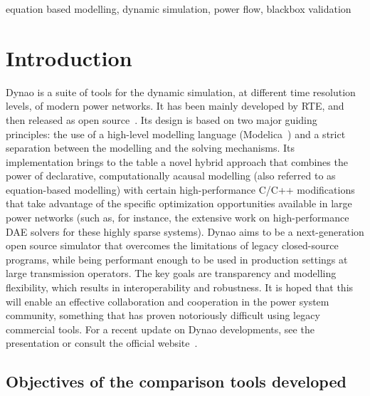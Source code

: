 \documentclass[conference]{IEEEtran}
\newcommand{\Dynawo}{Dyna\textomega o\xspace} %
\begin{document}
\begin{IEEEkeywords}
  equation based modelling, dynamic simulation, power flow, blackbox validation
\end{IEEEkeywords}




\section{Introduction}

\Dynawo\cite{Guironnet18} is a suite of tools for the dynamic simulation, at
different time resolution levels, of modern power networks.  It has been mainly
developed by RTE, and then released as open source~\cite{Dynawo}. Its design is
based on two major guiding principles: the use of a high-level modelling
language (Modelica~\cite{Modelica}) and a strict separation between the
modelling and the solving mechanisms.  Its implementation brings to the table a
novel hybrid approach that combines the power of declarative, computationally
acausal modelling (also referred to as equation-based modelling) with certain
high-performance C/C++ modifications that take advantage of the specific
optimization opportunities available in large power networks (such as, for
instance, the extensive work on high-performance DAE solvers for these highly
sparse systems).  \Dynawo aims to be a next-generation open source simulator
that overcomes the limitations of legacy closed-source programs, while being
performant enough to be used in production settings at large transmission
operators. The key goals are transparency and modelling flexibility, which
results in interoperability and robustness. It is hoped that this will enable an
effective collaboration and cooperation in the power system community, something
that has proven notoriously difficult using legacy commercial tools.  For a
recent update on \Dynawo developments, see the presentation \cite{Guironnet21}
or consult the official website~\cite{Dynawo}.



\subsection{Objectives of the comparison tools developed}
\end{document}
